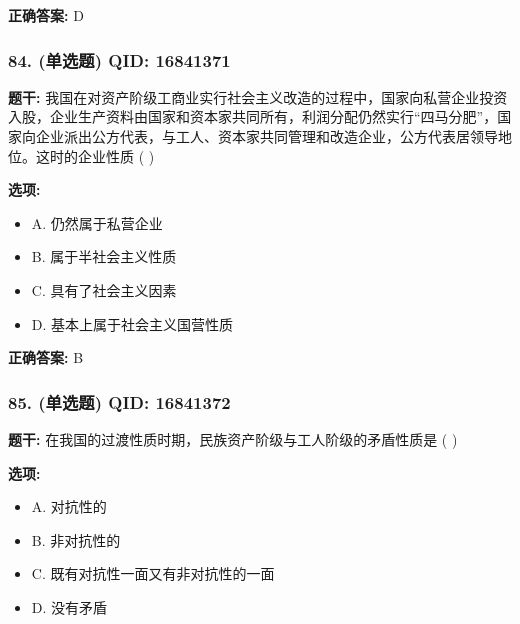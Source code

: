 \documentclass[12pt,UTF8]{ctexart}
\begin{document}
\textbf{正确答案:}
D

\vspace{0.3em}\hrulefill\vspace{0.7em}

\subsubsection*{84. (单选题) \small QID: 16841371}

\textbf{题干:}
我国在对资产阶级工商业实行社会主义改造的过程中，国家向私营企业投资入股，企业生产资料由国家和资本家共同所有，利润分配仍然实行“四马分肥”，国家向企业派出公方代表，与工人、资本家共同管理和改造企业，公方代表居领导地位。这时的企业性质 ( )

\textbf{选项:}
\begin{itemize}[leftmargin=*]

  \item A. 仍然属于私营企业

  \item B. 属于半社会主义性质

  \item C. 具有了社会主义因素

  \item D. 基本上属于社会主义国营性质

\end{itemize}

\textbf{正确答案:}
B

\vspace{0.3em}\hrulefill\vspace{0.7em}

\subsubsection*{85. (单选题) \small QID: 16841372}

\textbf{题干:}
在我国的过渡性质时期，民族资产阶级与工人阶级的矛盾性质是 ( )

\textbf{选项:}
\begin{itemize}[leftmargin=*]

  \item A. 对抗性的

  \item B. 非对抗性的

  \item C. 既有对抗性一面又有非对抗性的一面

  \item D. 没有矛盾

\end{itemize}
\end{document}
